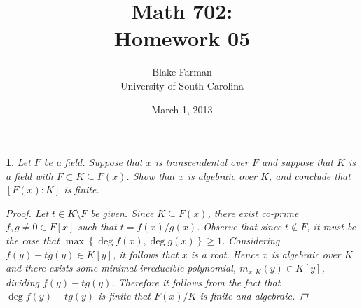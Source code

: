\documentclass[10pt]{amsart}
\author{Blake Farman\\University of South Carolina}
\title{Math 702:\\Homework 05}
\date{March 1, 2013}
\begin{document}
\maketitle

\providecommand{\p}{\mathfrak{p}}
\providecommand{\m}{\mathfrak{m}}

\newtheorem{thm}{}
\newtheorem{lem}{Lemma}

\begin{thm}
  Let $F$ be a field.
  Suppose that $x$ is transcendental over $F$ and suppose that $K$ is a field with $F \subset K \subseteq F(x)$.
  Show that $x$ is algebraic over $K$, and conclude that $[F(x) : K]$ is finite.
  
  \begin{proof}
    Let $t \in K \setminus F$ be given.
    Since $K \subseteq F(x)$, there exist co-prime $f, g \neq 0 \in F[x]$ such that $t = f(x) / g(x)$.
    Observe that since $t \not \in F$, it must be the case that $\max\left\{\deg{f(x)}, \deg{g(x)}\right\} \geq 1$.
    Considering $f(y) - tg(y) \in K[y]$, it follows that $x$ is a root.
    Hence $x$ is algebraic over $K$ and there exists some minimal irreducible polynomial, $m_{x,K}(y) \in K[y]$, dividing $f(y) - tg(y)$.
    Therefore it follows from the fact that $\deg{f(y) - tg(y)}$ is finite that $F(x)/K$ is finite and algebraic.
  \end{proof}
\end{thm}
\end{document}
